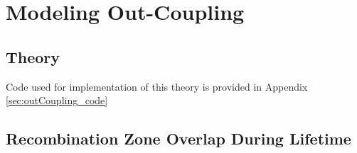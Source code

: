 \documentclass[../thesis.tex]{subfiles}
\begin{document}
\chapter{Modeling Out-Coupling} \label{sec:out_coupling}

\section{Theory}


Code used for implementation of this theory is provided in Appendix \ref{sec:outCoupling_code}

\section{Recombination Zone Overlap During Lifetime}




\end{document}
